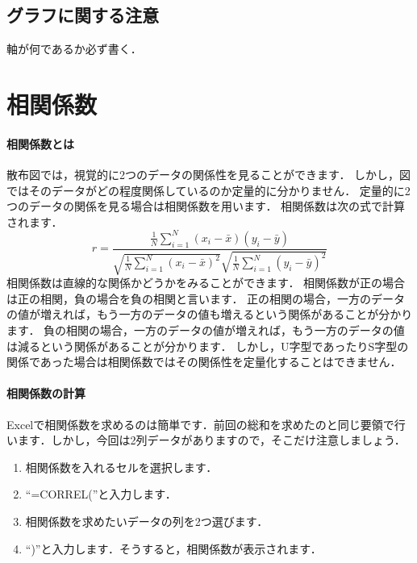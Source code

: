 \subsection{グラフに関する注意}

軸が何であるか必ず書く．


\section{相関係数}

\paragraph{相関係数とは}

散布図では，視覚的に2つのデータの関係性を見ることができます．
しかし，図ではそのデータがどの程度関係しているのか定量的に分かりません．
定量的に2つのデータの関係を見る場合は相関係数を用います．
相関係数は次の式で計算されます．
\begin{equation}
    \label{eq:1}
    r = \frac{\frac{1}{N} \sum_{i=1}^N (x_i - \bar{x})(y_i - \bar{y})}{\sqrt{\frac{1}{N} \sum_{i=1}^N (x_i - \bar{x})^2} \sqrt{\frac{1}{N} \sum_{i=1}^N(y_i - \bar{y})^2}}
\end{equation}
相関係数は直線的な関係かどうかをみることができます．
相関係数が正の場合は正の相関，負の場合を負の相関と言います．
正の相関の場合，一方のデータの値が増えれば，もう一方のデータの値も増えるという関係があることが分かります．
負の相関の場合，一方のデータの値が増えれば，もう一方のデータの値は減るという関係があることが分かります．
しかし，U字型であったりS字型の関係であった場合は相関係数ではその関係性を定量化することはできません．


\paragraph{相関係数の計算}

Excelで相関係数を求めるのは簡単です．前回の総和を求めたのと同じ要領で行います．しかし，今回は2列データがありますので，そこだけ注意しましょう．

\begin{enumerate}
    \item 相関係数を入れるセルを選択します．
    \item ``=CORREL(''と入力します．
    \item 相関係数を求めたいデータの列を2つ選びます．
    \item ``)''と入力します．そうすると，相関係数が表示されます．
\end{enumerate}

